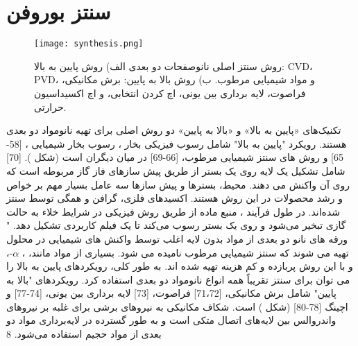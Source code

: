 \section{سنتز بوروفن}
\begin{figure*}
    \texttt{[image: synthesis.png]}
    \caption{روش سنتز اصلی نانوصفحات دو بعدی الف) روش پایین به بالا: CVD، PVD، و مواد شیمیایی مرطوب. ب) روش بالا به پایین: برش مکانیکی، فراصوت، لایه برداری بین یونی، اچ کردن انتخابی، و اچ اکسیداسیون حرارتی.}
\end{figure*}
تکنیک‌های «پایین به بالا» و «بالا به پایین» دو روش اصلی برای تهیه نانومواد دو بعدی هستند. رویکرد "پایین به بالا" شامل رسوب فیزیکی بخار ، \cite{parkCrystallizationInducedPropertiesMorphologyControlled2014, zhaoPatternedGrowthVertically2010, zhaoVerticalOrganicNanowire2009} رسوب بخار شیمیایی ،\cite{zhangReviewChemicalVapor2013, akhavanToxicityGrapheneGraphene2010} [58-65] و روش های سنتز شیمیایی مرطوب، \cite{hanSynthesisStructuralTransformations2013, wuWelldefinedBiOClColloidal2015}[66-69] در میان دیگران است (شکل ). \cite{mannixSynthesisChemistryElemental2017}[70]  شامل تشکیل یک لایه روی یک بستر از طریق پیش سازهای فاز گاز مربوطه است که روی آن واکنش می دهند. محیط، بسترها و پیش سازها سه عامل بسیار مهم بر خواص و رشد محصولات در این روش هستند. اکسیدهای فلزی، گرافن و  همگی توسط  سنتز شده‌اند. در طول فرآیند ، منبع ماده از طریق روش فیزیکی در شرایط خلاء به حالت گازی تبخیر می‌شود و روی یک بستر رسوب می‌کند تا یک فیلم کاربردی تشکیل دهد. "
ورقه های نانو دو بعدی از مواد بدون لایه اغلب توسط واکنش های شیمیایی در محلول تهیه می شوند که سنتز شیمیایی مرطوب نامیده می شود. بسیاری از مواد مانند، ، $\alpha$-،  و  با این روش پربازده و کم هزینه تهیه شده اند. به طور کلی، رویکردهای پایین به بالا را می توان برای سنتز تقریباً همه انواع نانومواد دو بعدی استفاده کرد. رویکردهای "بالا به پایین" شامل برش مکانیکی، \cite{liPreparationApplicationsMechanically2014, yiReviewMechanicalExfoliation2015}[71،72] فراصوت، \cite{nicolosiLiquidExfoliationLayered2013}[73] لایه برداری بین یونی، \cite{yuwenRapidPreparationSinglelayer2016, zengSingleLayerSemiconductingNanosheets2011}[74-77] و اچینگ \cite{anasoriTwoDimensionalOrderedDouble2015, naguibNewTwoDimensionalNiobium2013, naguibTwoDimensionalNanocrystalsProduced2011}[78-80] (شکل ) است. شکاف مکانیکی به نیروهای برشی برای غلبه بر نیروهای واندروالس بین لایه‌های اتصال متکی است و به طور گسترده در لایه‌برداری مواد دو بعدی از مواد حجیم استفاده می‌شود. 8
